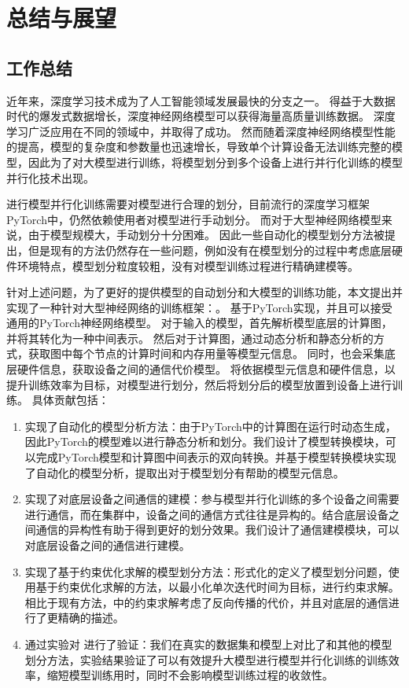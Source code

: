 
\chapter{总结与展望}
\label{sec:summary}

\section{工作总结}
近年来，深度学习技术成为了人工智能领域发展最快的分支之一。
得益于大数据时代的爆发式数据增长，深度神经网络模型可以获得海量高质量训练数据。
深度学习广泛应用在不同的领域中，并取得了成功。
然而随着深度神经网络模型性能的提高，模型的复杂度和参数量也迅速增长，导致单个计算设备无法训练完整的模型，因此为了对大模型进行训练，将模型划分到多个设备上进行并行化训练的模型并行化技术出现。

进行模型并行化训练需要对模型进行合理的划分，目前流行的深度学习框架PyTorch中，仍然依赖使用者对模型进行手动划分。
而对于大型神经网络模型来说，由于模型规模大，手动划分十分困难。
因此一些自动化的模型划分方法被提出，但是现有的方法仍然存在一些问题，例如没有在模型划分的过程中考虑底层硬件环境特点，模型划分粒度较粗，没有对模型训练过程进行精确建模等。

针对上述问题，为了更好的提供模型的自动划分和大模型的训练功能，本文提出并实现了一种针对大型神经网络的训练框架：\sys{}。
\sys{}基于PyTorch实现，并且可以接受通用的PyTorch神经网络模型。
对于输入的模型，\sys{}首先解析模型底层的计算图，并将其转化为一种中间表示。
然后对于计算图，\sys{}通过动态分析和静态分析的方式，获取图中每个节点的计算时间和内存用量等模型元信息。
同时，\sys{}也会采集底层硬件信息，获取设备之间的通信代价模型。
\sys{}将依据模型元信息和硬件信息，以提升训练效率为目标，对模型进行划分，然后将划分后的模型放置到设备上进行训练。
具体贡献包括：
\begin{enumerate}
	\item 实现了自动化的模型分析方法：由于PyTorch中的计算图在运行时动态生成，因此PyTorch的模型难以进行静态分析和划分。我们设计了模型转换模块，可以完成PyTorch模型和计算图中间表示的双向转换。并基于模型转换模块实现了自动化的模型分析，提取出对于模型划分有帮助的模型元信息。
	\item 实现了对底层设备之间通信的建模：参与模型并行化训练的多个设备之间需要进行通信，而在集群中，设备之间的通信方式往往是异构的。结合底层设备之间通信的异构性有助于得到更好的划分效果。我们设计了通信建模模块，可以对底层设备之间的通信进行建模。
	\item 实现了基于约束优化求解的模型划分方法：\sys{}形式化的定义了模型划分问题，使用基于约束优化求解的方法，以最小化单次迭代时间为目标，进行约束求解。相比于现有方法，\sys{}中的约束求解考虑了反向传播的代价，并且对底层的通信进行了更精确的描述。
	\item 通过实验对\sys{} 进行了验证：我们在真实的数据集和模型上对比了\sys{}和其他的模型划分方法，实验结果验证了\sys{}可以有效提升大模型进行模型并行化训练的训练效率，缩短模型训练用时，同时不会影响模型训练过程的收敛性。
\end{enumerate}


